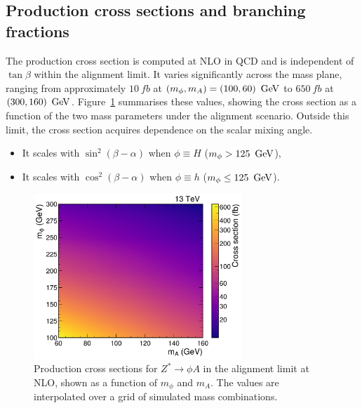 \subsection{Production cross sections and branching fractions}

The production cross section is computed at NLO in QCD and is independent of $\tan\beta$ within the alignment limit. It varies significantly across the mass plane, ranging from approximately $10~\unit{fb}$ at $(m_\phi, m_A) = (100, 60)~\,\text{Ge\hspace{-.08em}V}$ to $650~\unit{fb}$ at $(300, 160)~\,\text{Ge\hspace{-.08em}V}$. Figure~\ref{Figure:Chapter6_ProductionXS} summarises these values, showing the cross section as a function of the two mass parameters under the alignment scenario. Outside this limit, the cross section acquires dependence on the scalar mixing angle.

\begin{itemize}
    \item It scales with $\sin^2(\beta - \alpha)$ when $\phi \equiv H$ ($m_\phi > 125~\,\text{Ge\hspace{-.08em}V}$),
    \item It scales with $\cos^2(\beta - \alpha)$ when $\phi \equiv h$ ($m_\phi \leq 125~\,\text{Ge\hspace{-.08em}V}$).
\end{itemize}

\begin{figure}[!htbp]
  \centering
  \includegraphics[width=0.7\textwidth]{Figures/Chapter6/Production_XS.pdf}
    \caption[Production cross sections for $Z^* \to \phi A$ in the alignment limit.]{Production cross sections for $Z^* \to \phi A$ in the alignment limit at NLO, shown as a function of $m_\phi$ and $m_A$. The values are interpolated over a grid of simulated mass combinations.}
  \label{Figure:Chapter6_ProductionXS}
\end{figure}

